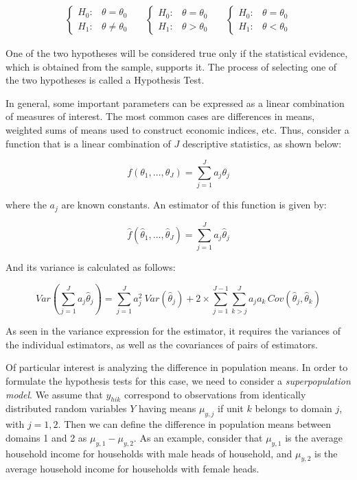 \documentclass[
  12pt,
]{book}
\begin{document}
\begin{eqnarray*}
\begin{cases}
H_{0}: & \theta=\theta_{0}\\
H_{1}: & \theta\neq\theta_{0}
\end{cases}\,\,\,\,\,\,\,\,\,   
\begin{cases}
H_{0}: & \theta=\theta_{0}\\
H_{1}: & \theta>\theta_{0}
\end{cases}\,\,\,\,\,\,\,\,\,   
\begin{cases}
H_{0}: & \theta=\theta_{0}\\
H_{1}: & \theta<\theta_{0}
\end{cases}
\end{eqnarray*}

One of the two hypotheses will be considered true only if the statistical evidence, which is obtained from the sample, supports it. The process of selecting one of the two hypotheses is called a Hypothesis Test.

In general, some important parameters can be expressed as a linear combination of measures of interest. The most common cases are differences in means, weighted sums of means used to construct economic indices, etc. Thus, consider a function that is a linear combination of \(J\) descriptive statistics, as shown below:

\[
f \left( \theta_{1}, \ldots,\theta_{J}\right) = \sum_{j=1}^{J}a_{j}\theta_{j}
\]

where the \(a_{j}\) are known constants. An estimator of this function is given by:

\[
\widehat{f} \left( \widehat{\theta}_{1}, \ldots, \widehat{\theta}_{J} \right) = \sum_{j=1}^{J} a_{j} \widehat{\theta}_{j}
\]

And its variance is calculated as follows:

\[
Var \left( \sum_{j=1}^{J} a_{j} \widehat{\theta}_{j} \right) = \sum_{j=1}^{J} a_{j}^{2} \ Var\left( \widehat{\theta}_{j} \right) + 2 \times \sum_{j=1}^{J-1} \sum_{k>j}^{J} a_{j} a_{k} \, Cov \left( \widehat{\theta}_{j} , \widehat{\theta}_{k} \right)
\]

As seen in the variance expression for the estimator, it requires the variances of the individual estimators, as well as the covariances of pairs of estimators.

Of particular interest is analyzing the difference in population means. In order to formulate the hypothesis tests for this case, we need to consider a \emph{superpopulation model}. We assume that \(y_{hik}\) correspond to observations from identically distributed random variables \(Y\) having means \(\mu_{y,j}\) if unit \(k\) belongs to domain \(j\), with \(j = 1, 2\). Then we can define the difference in population means between domains 1 and 2 as \(\mu_{y,1} - \mu_{y,2}\). As an example, consider that \(\mu_{y,1}\) is the average household income for households with male heads of household, and \(\mu_{y,2}\) is the average household income for households with female heads.
\end{document}
